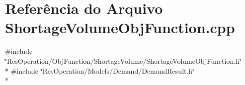 \section{Referência do Arquivo Shortage\+Volume\+Obj\+Function.\+cpp}
\label{_obj_function_2_shortage_volume_2_shortage_volume_obj_function_8cpp}
{\ttfamily \#include \char`\"{}Res\+Operation/\+Obj\+Function/\+Shortage\+Volume/\+Shortage\+Volume\+Obj\+Function.\+h\char`\"{}}\\*
{\ttfamily \#include \char`\"{}Res\+Operation/\+Models/\+Demand/\+Demand\+Result.\+h\char`\"{}}\\*
